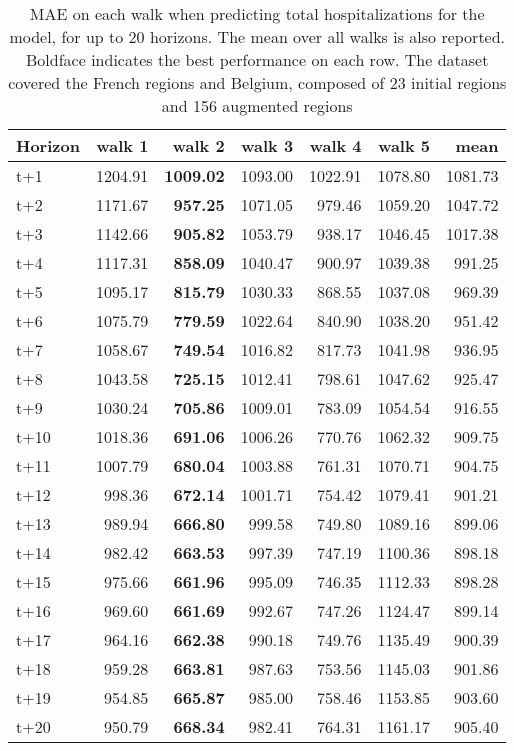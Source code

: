 \begin{table}[H]
\centering
\caption{MAE on each walk when predicting total hospitalizations for the model, for up to 20 horizons. The mean over all walks is also reported. Boldface indicates the best performance on each row. The dataset covered the French regions and Belgium, composed of 23 initial regions and 156 augmented regions }
\label{tab:MAE_walk_encoder_decoder}
\begin{tabular}{lrrrrrr}
\toprule
Horizon &  walk 1 &  walk 2 &  walk 3 &  walk 4 &  walk 5 &    mean \\
\midrule
t+1  & 1204.91  & \textbf{1009.02}  & 1093.00  & 1022.91  & 1078.80  & 1081.73  \\
t+2  & 1171.67  & \textbf{957.25}  & 1071.05  & 979.46  & 1059.20  & 1047.72  \\
t+3  & 1142.66  & \textbf{905.82}  & 1053.79  & 938.17  & 1046.45  & 1017.38  \\
t+4  & 1117.31  & \textbf{858.09}  & 1040.47  & 900.97  & 1039.38  & 991.25  \\
t+5  & 1095.17  & \textbf{815.79}  & 1030.33  & 868.55  & 1037.08  & 969.39  \\
t+6  & 1075.79  & \textbf{779.59}  & 1022.64  & 840.90  & 1038.20  & 951.42  \\
t+7  & 1058.67  & \textbf{749.54}  & 1016.82  & 817.73  & 1041.98  & 936.95  \\
t+8  & 1043.58  & \textbf{725.15}  & 1012.41  & 798.61  & 1047.62  & 925.47  \\
t+9  & 1030.24  & \textbf{705.86}  & 1009.01  & 783.09  & 1054.54  & 916.55  \\
t+10  & 1018.36  & \textbf{691.06}  & 1006.26  & 770.76  & 1062.32  & 909.75  \\
t+11  & 1007.79  & \textbf{680.04}  & 1003.88  & 761.31  & 1070.71  & 904.75  \\
t+12  & 998.36  & \textbf{672.14}  & 1001.71  & 754.42  & 1079.41  & 901.21  \\
t+13  & 989.94  & \textbf{666.80}  & 999.58  & 749.80  & 1089.16  & 899.06  \\
t+14  & 982.42  & \textbf{663.53}  & 997.39  & 747.19  & 1100.36  & 898.18  \\
t+15  & 975.66  & \textbf{661.96}  & 995.09  & 746.35  & 1112.33  & 898.28  \\
t+16  & 969.60  & \textbf{661.69}  & 992.67  & 747.26  & 1124.47  & 899.14  \\
t+17  & 964.16  & \textbf{662.38}  & 990.18  & 749.76  & 1135.49  & 900.39  \\
t+18  & 959.28  & \textbf{663.81}  & 987.63  & 753.56  & 1145.03  & 901.86  \\
t+19  & 954.85  & \textbf{665.87}  & 985.00  & 758.46  & 1153.85  & 903.60  \\
t+20  & 950.79  & \textbf{668.34}  & 982.41  & 764.31  & 1161.17  & 905.40  \\

\bottomrule
\end{tabular}
\end{table}
